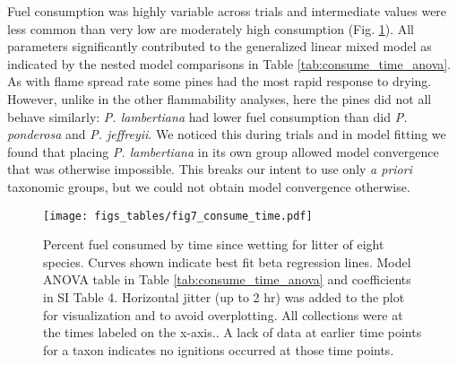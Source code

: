 \documentclass[fire,article,submit,moreauthors,pdftex]{Definitions/mdpi}
\begin{document}
\begin{table}[H]
  \caption[Mixed linear model of flame spread rate.]{Mixed model results for flame spread rate  as a function of time since wetting with genus as a fixed effect and species as a nested random effect. Approximate degrees of freedom, pseudo F statistics and p-values were calculated by the Kenward-Roger approximation \cite{Kenward_Roger-1997}. Estimated coefficients are in SI Table 4}
  \label{tab:spread_time_anova}
\centering

\end{table}

Fuel consumption was highly variable across trials and intermediate values were less common than very low are moderately high consumption (Fig. \ref{fig:consume_time}). All parameters significantly contributed to the generalized linear mixed model as indicated by the nested model comparisons in Table \ref{tab:consume_time_anova}. As with flame spread rate some pines had the most rapid response to drying. However, unlike in the other flammability analyses, here the pines did not all behave similarly: \emph{P. lambertiana} had lower fuel consumption than did \emph{P. ponderosa} and \emph{P. jeffreyii}. We noticed this during trials and in model fitting we found that placing \emph{P. lambertiana} in its own group allowed model convergence that was otherwise impossible. This breaks our intent to use only \emph{a priori} taxonomic groups, but we could not obtain model convergence otherwise.


\begin{figure}[H]
  \centering
\texttt{[image: figs\_tables/fig7\_consume\_time.pdf]}
\caption{Percent fuel consumed by time since wetting for litter of eight
  species. Curves shown indicate best fit beta regression lines. Model ANOVA
  table in Table \ref{tab:consume_time_anova} and coefficients in SI Table
  4. Horizontal jitter (up to 2 hr) was added to the plot for visualization and
  to avoid overplotting. All collections were at the times labeled on the
  x-axis.. A lack of data at earlier time points for a taxon indicates no
  ignitions occurred at those time points.}
  \label{fig:consume_time}
\end{figure}

\begin{table}[H]
  \caption{Generalized linear mixed model results for fuel consumption as a function of time since wetting with taxonomic group as a fixed effet and species as a nested random effect. The table shows sequential chi-square tests on nested beta regression models. The analysis of deviance table below shows deviance comparisons for the simplest null model with only intercept and random effect (model 1), for a taxon effect only (model 2), for a taxon and mosture content effect (model 3) and for the full model including the taxon by moisture interaction (model 4). Coefficient estimates for the full model are in SI Table 5.}
  \label{tab:consume_time_anova}
\centering

\end{table}
\end{document}
